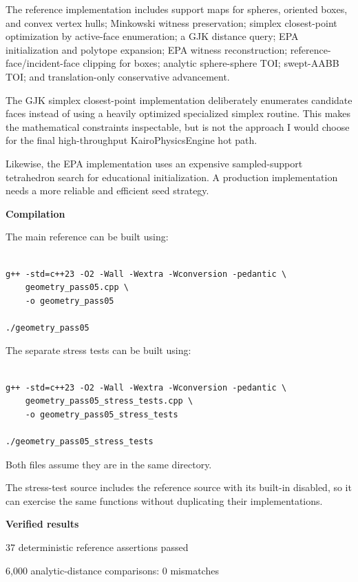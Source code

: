 The reference implementation includes support maps for spheres, oriented boxes, and convex vertex hulls; Minkowski witness preservation; simplex closest-point optimization by active-face enumeration; a GJK distance query; EPA initialization and polytope expansion; EPA witness reconstruction; reference-face/incident-face clipping for boxes; analytic sphere-sphere TOI; swept-AABB TOI; and translation-only conservative advancement.

The GJK simplex closest-point implementation deliberately enumerates candidate faces instead of using a heavily optimized specialized simplex routine. This makes the mathematical constraints inspectable, but is not the approach I would choose for the final high-throughput KairoPhysicsEngine hot path.

Likewise, the EPA implementation uses an expensive sampled-support tetrahedron search for educational initialization. A production implementation needs a more reliable and efficient seed strategy.

\textbf{Compilation}

The main reference can be built using:

\begin{verbatim}

g++ -std=c++23 -O2 -Wall -Wextra -Wconversion -pedantic \
    geometry_pass05.cpp \
    -o geometry_pass05

./geometry_pass05
\end{verbatim}

The separate stress tests can be built using:

\begin{verbatim}

g++ -std=c++23 -O2 -Wall -Wextra -Wconversion -pedantic \
    geometry_pass05_stress_tests.cpp \
    -o geometry_pass05_stress_tests

./geometry_pass05_stress_tests
\end{verbatim}

Both files assume they are in the same directory.

The stress-test source includes the reference source with its built-in  disabled, so it can exercise the same functions without duplicating their implementations.

\textbf{Verified results}

37 deterministic reference assertions passed

6,000 analytic-distance comparisons: 0 mismatches

